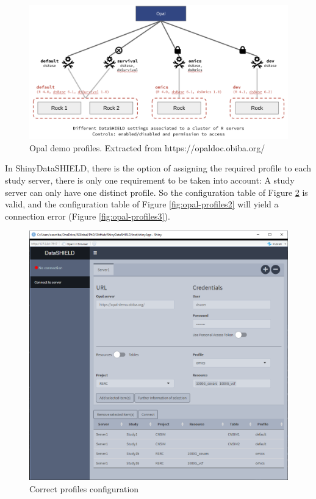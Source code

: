 \documentclass[
]{book}
\begin{document}
\begin{figure}

{\centering \includegraphics[width=29.14in]{images/opal-datashield-profiles} 

}

\caption{Opal demo profiles. Extracted from https://opaldoc.obiba.org/}\label{fig:opal-profiles}
\end{figure}

In ShinyDataSHIELD, there is the option of assigning the required profile to each study server, there is only one requirement to be taken into account: A study server can only have one distinct profile. So the configuration table of Figure \ref{fig:opal-profiles1} is valid, and the configuration table of Figure \ref{fig:opal-profiles2} will yield a connection error (Figure \ref{fig:opal-profiles3}).

\begin{figure}

{\centering \includegraphics[width=13.81in]{images/opal-datashield-profiles1} 

}

\caption{Correct profiles configuration}\label{fig:opal-profiles1}
\end{figure}
\end{document}
